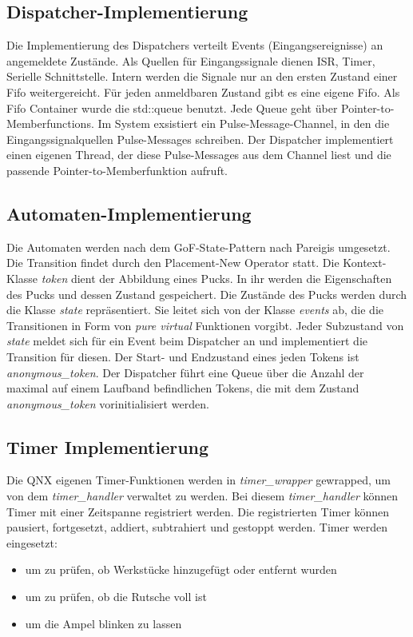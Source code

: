 \documentclass[oneside,a4paper,titlepage]{scrartcl} %
\begin{document}
\subsection{Dispatcher-Implementierung}
Die Implementierung des Dispatchers verteilt Events (Eingangsereignisse) an angemeldete Zustände.
Als Quellen für Eingangssignale dienen ISR, Timer, Serielle Schnittstelle. Intern werden die Signale
nur an den ersten Zustand einer Fifo weitergereicht. Für jeden anmeldbaren Zustand gibt es eine eigene Fifo. \newline
Als Fifo Container wurde die std::queue benutzt. Jede Queue geht über Pointer-to-Memberfunctions.
Im System exsistiert ein Pulse-Message-Channel, in den die Eingangssignalquellen Pulse-Messages schreiben.
Der Dispatcher implementiert einen eigenen Thread, der diese Pulse-Messages aus dem Channel liest und die passende Pointer-to-Memberfunktion aufruft.

\subsection{Automaten-Implementierung}
Die Automaten werden nach dem GoF-State-Pattern nach Pareigis umgesetzt. Die Transition findet durch den
Placement-New Operator statt. Die Kontext-Klasse \emph{token} dient der Abbildung eines Pucks. In ihr werden die
Eigenschaften des Pucks und dessen Zustand gespeichert.\newline
Die Zustände des Pucks werden durch die Klasse \emph{state} repräsentiert. Sie leitet sich von der Klasse
\emph{events} ab, die die Transitionen in Form von \emph{pure virtual} Funktionen vorgibt.\newline
Jeder Subzustand von \emph{state} meldet sich für ein Event beim Dispatcher an und implementiert die Transition
für diesen.\newline
Der Start- und Endzustand eines jeden Tokens ist \emph{anonymous\_token}.\newline
Der Dispatcher führt eine Queue über die Anzahl der maximal auf einem Laufband befindlichen Tokens, die mit dem Zustand
\emph{anonymous\_token} vorinitialisiert werden.

\subsection{Timer Implementierung}
Die QNX eigenen Timer-Funktionen werden in \emph{timer\_wrapper} gewrapped, um von dem \emph{timer\_handler} verwaltet zu werden. Bei diesem \emph{timer\_handler} können Timer mit einer Zeitspanne registriert werden.
Die registrierten Timer können pausiert, fortgesetzt, addiert, subtrahiert und gestoppt werden.\newline
Timer werden eingesetzt:
\begin{itemize}
    \item um zu prüfen, ob Werkstücke hinzugefügt oder entfernt wurden
    \item um zu prüfen, ob die Rutsche voll ist
    \item um die Ampel blinken zu lassen
\end{itemize}
\end{document}
